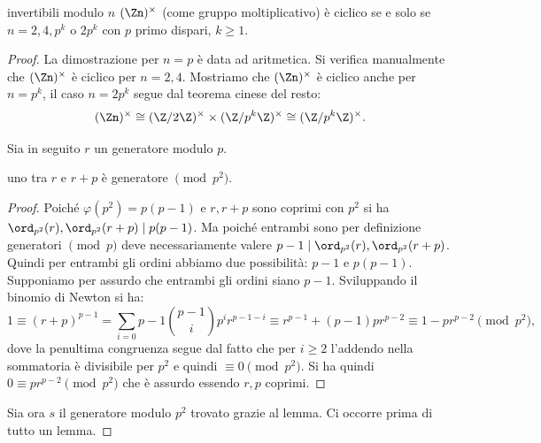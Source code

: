 \begin{proposition}{invertibili modulo $n$}
    $(\Zn)^\times$ (come gruppo moltiplicativo) è ciclico se e solo se $n = 2,4,p^k$ o $2p^k$ con $p$ primo dispari, $k \geq 1$.
\end{proposition}
\begin{proof}
    La dimostrazione per $n = p$ è data ad aritmetica. Si verifica manualmente che $(\Zn)^\times$ è ciclico per $n=2, 4$. Mostriamo che $(\Zn)^\times$ è ciclico anche per $n = p^k$, il caso $n = 2p^k$ segue dal teorema cinese del resto:
    \[
        (\Zn)^\times \cong (\Z/2\Z)^\times \times (\Z/p^k\Z)^\times \cong (\Z/p^k\Z)^\times.
    \]
    
    Sia in seguito $r$ un generatore modulo $p$.
    
    \begin{lemma2}
        uno tra $r$ e $r+p$ è generatore $\pmod{p^2}$.
    \end{lemma2}
    \begin{proof}
        Poiché $\varphi(p^2) = p(p-1)$ e $r,r+p$ sono coprimi con $p^2$ si ha $\ord_{p^2}(r), \ord_{p^2}(r+p) \mid p(p-1)$. Ma poiché entrambi sono per definizione generatori $\pmod{p}$ deve necessariamente valere $p-1  \mid  \ord_{p^2}(r), \ord_{p^2}(r+p)$. Quindi per entrambi gli ordini abbiamo due possibilità: $p-1$ e $p(p-1)$. Supponiamo per assurdo che entrambi gli ordini siano $p-1$. Sviluppando il binomio di Newton si ha:  \[ 1 \equiv (r + p)^{p-1} = \sum_{i=0}{p-1} \binom{p-1}{i}p^ir^{p-1-i} \equiv r^{p-1} + (p-1)pr^{p-2} \equiv 1 - pr^{p-2} \pmod{p^2}, \]
        dove la penultima congruenza segue dal fatto che per $i\geq 2$ l'addendo nella sommatoria è divisibile per $p^2$ e quindi $\equiv 0 \pmod{p^2}$. Si ha quindi $0 \equiv pr^{p-2} \pmod{p^2}$ che è assurdo essendo $r,p$ coprimi. 
    \end{proof}
    Sia ora $s$ il generatore modulo $p^2$ trovato grazie al lemma. Ci occorre prima di tutto un lemma.
    

\end{proof}
